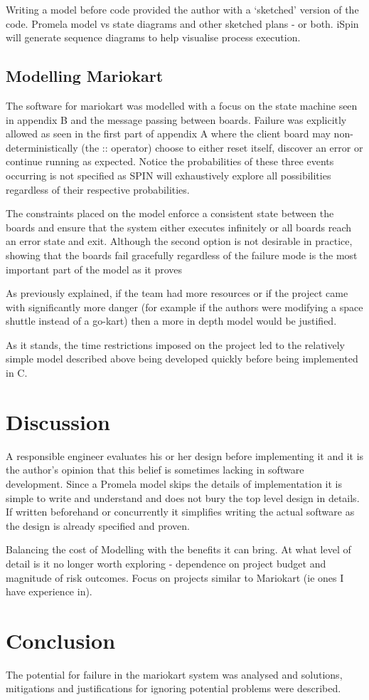 Writing a model before code provided the author with a `sketched' version of 
the code. 
Promela model vs state diagrams and other sketched plans - or both. iSpin will
 generate sequence diagrams to help visualise process execution.

\subsection{Modelling Mariokart}
The software for mariokart was modelled with a focus on the state machine seen in 
appendix B and the message passing between boards. Failure was explicitly allowed
as seen in the first part of appendix A where the client board may non-deterministically
(the :: operator) choose to either reset itself, discover an error or continue running as
expected. Notice the probabilities of these three events occurring is not specified
as SPIN will exhaustively explore all possibilities regardless of their respective probabilities.

The constraints placed on the model enforce a consistent state between
the boards and ensure that the system either executes infinitely or all boards reach an 
error state and exit. Although the second option is not desirable in practice, showing
that the boards fail gracefully regardless of the failure mode is the most important
part of the model as it proves 

As previously explained, if the team had more resources or if the
project came with significantly more danger (for example if the authors were modifying
a space shuttle instead of a go-kart) then a more in depth model would be justified.

As it stands, the time restrictions imposed on the project led to the relatively simple
model described above being developed quickly before being implemented in C.


\section{Discussion}
A responsible engineer evaluates his or her design before implementing it and it is the author's opinion 
that this belief is sometimes lacking in software development. Since a Promela model skips
the details of implementation it is simple to write and understand and does not bury the top level design 
in details. If written beforehand or concurrently it  simplifies writing the actual software 
as the design is already specified and proven.

Balancing the cost of Modelling with the benefits it can bring. At what level of detail is it no longer worth 
exploring - dependence on project budget and magnitude of risk outcomes. Focus on projects similar to
Mariokart (ie ones I have experience in).

\section{Conclusion}
The potential for failure in the mariokart system was analysed and solutions, mitigations and justifications
for ignoring potential problems were described. 
